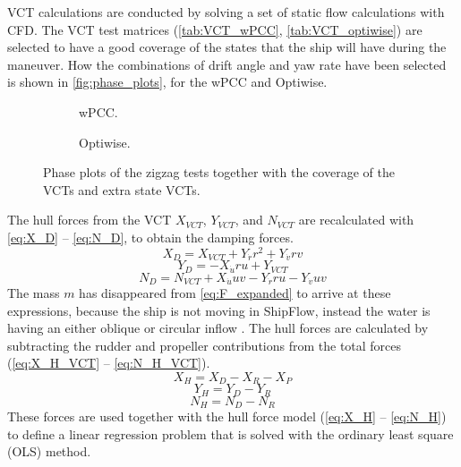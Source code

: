 VCT calculations are conducted by solving a set of static flow calculations with CFD. The VCT test matrices (\autoref{tab:VCT_wPCC}, \autoref{tab:VCT_optiwise}) are selected to have a good coverage of the states that the ship will have during the maneuver. How the combinations of drift angle and yaw rate have been selected is shown in \autoref{fig:phase_plots}, for the wPCC and Optiwise. 
\begin{figure}[h]
     \centering
     \begin{subfigure}[b]{0.49\textwidth}
         \centering
         
        \caption{wPCC.}
        \label{fig:VCT_phase_plot_wPCC}
     \end{subfigure}
     \hfill
     \begin{subfigure}[b]{0.49\textwidth}
        \centering
        
        \caption{Optiwise.}
        \label{fig:VCT_phase_plot_optiwise}
     \end{subfigure}
        \caption{Phase plots of the zigzag tests together with the coverage of the VCTs and extra state VCTs.}
        \label{fig:phase_plots}
\end{figure}

The hull forces from the VCT $X_{VCT}$, $Y_{VCT}$, and $N_{VCT}$ are recalculated with \autoref{eq:X_D} -- \autoref{eq:N_D}, to obtain the damping forces.
\begin{equation}
    \label{eq:X_D}
    X_{D} = X_{VCT} + Y_{\dot{r}} r^{2} + Y_{\dot{v}} r v
\end{equation}
\begin{equation}
    \label{eq:Y_D}
    Y_{D} = - X_{\dot{u}} r u + Y_{VCT}
\end{equation}
\begin{equation}
    \label{eq:N_D}
    N_{D} = N_{VCT} + X_{\dot{u}} u v - Y_{\dot{r}} r u - Y_{\dot{v}} u v
\end{equation}
The mass $m$ has disappeared from \autoref{eq:F_expanded} to arrive at these expressions, because the ship is not moving in ShipFlow, instead the water is having an either oblique or circular inflow \citep{roychoudhuryCFDSimulationsSteady2017}.
The hull forces are calculated by subtracting the rudder and propeller contributions from the total forces (\autoref{eq:X_H_VCT} -- \autoref{eq:N_H_VCT}).
\begin{equation}
    \label{eq:X_H_VCT}
    X_H = X_D - X_R - X_P
\end{equation}
\begin{equation}
    \label{eq:Y_H_VCT}
    Y_H = Y_D - Y_R
\end{equation}
\begin{equation}
    \label{eq:N_H_VCT}
    N_H = N_D - N_R
\end{equation}
These forces are used together with the hull force model (\autoref{eq:X_H} -- \autoref{eq:N_H}) to define a linear regression problem that is solved with the ordinary least square (OLS) method. 

